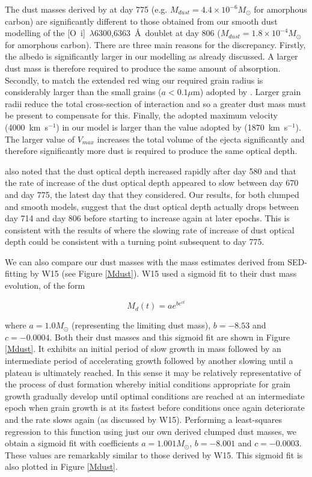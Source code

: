 \documentclass[useAMS,usenatbib,usegraphicx]{mnras}
\begin{document}
The dust masses derived by \citet{Lucy1989} at day 775 (e.g. $M_{dust}=4.4 \times 10^{-6} M_{\odot}$ for amorphous carbon) are significantly different to those obtained from our smooth dust modelling of the [O~{\sc i}]~$\lambda$6300,6363~\AA\ doublet at day 806 ($M_{dust}=1.8 \times 10^{-4} M_{\odot}$ for amorphous carbon).  There are three main reasons for the discrepancy.  Firstly, the albedo is significantly larger in our modelling as already discussed.  A larger dust mass is therefore required to produce the same amount of absorption.  Secondly, to match the extended red wing our required grain radius is considerably larger than the small grains ($a < 0.1\mu$m) adopted by \citet{Lucy1989}. Larger grain radii reduce the total cross-section of interaction and so a greater dust mass must be present to compensate for this. Finally, the adopted maximum velocity (4000~km~s$^{-1}$) in our model is larger than the value adopted by \citet{Lucy1989} (1870~km~s$^{-1}$).  The larger value of $V_{max}$ increases the total volume of the ejecta significantly and therefore significantly more dust is required to produce the same optical depth.

\citet{Lucy1989} also noted that the dust optical depth increased rapidly after day 580 and that the rate of increase of the dust optical depth appeared to slow between day 670 and day 775, the latest day that they considered.  Our results, for both clumped and smooth models, suggest that the dust optical depth actually drops between day 714 and day 806 before starting to increase again at later epochs.  This is consistent with the results of \citet{Lucy1989} where the slowing rate of increase of dust optical depth could be consistent with a turning point subsequent to day 775.  

We can also compare our dust masses with the mass estimates derived from SED-fitting by W15  (see Figure \ref{Mdust}).  W15 used a sigmoid 
fit to their dust mass evolution, of the form

\begin{equation}
M_d(t)=ae^{be^{ct}}
\end{equation}
 
\noindent where  $a=1.0M_{\odot}$ (representing the limiting 
dust mass), $b=-8.53$ and $c=-0.0004$.  Both their dust masses and this 
sigmoid fit are shown in Figure \ref{Mdust}.  It exhibits an initial 
period of slow growth in mass followed by an intermediate period of accelerating growth
followed by another slowing until a plateau is ultimately reached.  In 
this sense it may be relatively representative of the process of dust 
formation whereby initial conditions appropriate for grain growth 
gradually develop until optimal conditions are reached at an intermediate 
epoch when grain growth is at its fastest before conditions once again 
deteriorate and the rate slows again (as discussed by W15).  Performing a 
least-squares regression to this function using just our own derived clumped dust masses, 
we obtain a sigmoid fit with coefficients $a=1.001M_{\odot}$, $b=-8.001$ 
and $c=-0.0003$.  These values are remarkably similar to those derived 
by W15.  This sigmoid fit is also plotted in Figure \ref{Mdust}.
\end{document}
